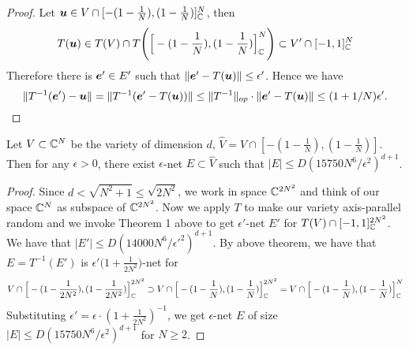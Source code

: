 {\begin{proof}
Let $\bm u \in V \cap [-(1-\frac{1}{N}),(1-\frac{1}{N})]^N_{\mathbb{C}}$, then
$$
T(\bm u) \in T(V) \cap T\Bigg(\Big[-(1-\frac{1}{N}),(1-\frac{1}{N})\Big]^N_{\mathbb{C}}\Bigg) \subset V' \cap [-1,1]^N_{\mathbb{C}}
$$
Therefore there is $\bm e'\in E'$ such that $\|\bm e'-T(\bm u)\|\le \epsilon'$. Hence we have 
$$
\|T^{-1}(\bm e')-\bm u\| = \|T^{-1}(\bm e'-T(\bm u))\| \le \|T^{-1}\|_{op}\cdot \|\bm e'-T(\bm u)\| \le (1+1/N)\epsilon'.
$$
\end{proof}
\begin{theorem}
Let $V\subset \mathbb{C}^N$ be the variety of dimension $d$, $\hat V = V \cap [-(1-\frac{1}{N}),(1-\frac{1}{N})]$. Then for any $\epsilon>0$, there exist $\epsilon$-net $E\subset \hat V$ such that $|E| \le D(15750N^6/\epsilon^2)^{d+1}$.
\end{theorem}
\begin{proof}
Since $d < \sqrt{N^2+1} \le \sqrt{2N^2}$, we work in space $\mathbb{C}^{2N^2}$ and think of our space $\mathbb{C}^N$ as subspace of $\mathbb{C}^{2N^2}$. Now we apply $T$ to make our variety axis-parallel random and we invoke Theorem 1 above to get $\epsilon'$-net $E'$ for $T(V)\cap[-1,1]^{2N^2}_{\mathbb{C}}$. We have that $|E'|\le D(14000N^6/\epsilon'^2)^{d+1}$. By above theorem, we have that $E=T^{-1}(E')$ is $\epsilon'\Big(1+\frac{1}{2N^2}\Big)$-net for 
$$
V\cap\Big[-(1-\frac{1}{2N^2}),(1-\frac{1}{2N^2})\Big]^{2N^2}_{\mathbb{C}} \supset V \cap \Big[-(1-\frac{1}{N}),(1-\frac{1}{N})\Big]^{2N^2}_{\mathbb{C}}= V \cap \Big[-(1-\frac{1}{N}),(1-\frac{1}{N})\Big]^{N}_{\mathbb{C}}
$$
Substituting $\epsilon'=\epsilon\cdot(1+\frac{1}{2N^2})^{-1}$, we get $\epsilon$-net $E$ of size $|E| \le D(15750N^6/\epsilon^2)^{d+1}$ for $N\ge2$.
\end{proof}
}